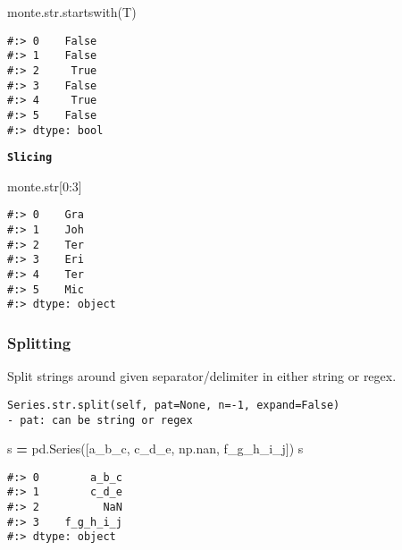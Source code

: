 \documentclass[
]{book}
\newenvironment{Shaded}{\begin{snugshade}}{\end{snugshade}}
\newcommand{\BuiltInTok}[1]{#1}
\newcommand{\DecValTok}[1]{\textcolor[rgb]{0.06,0.06,0.06}{#1}}
\newcommand{\NormalTok}[1]{#1}
\newcommand{\OperatorTok}[1]{\textcolor[rgb]{0.43,0.43,0.43}{\textbf{#1}}}
\newcommand{\StringTok}[1]{\textcolor[rgb]{0.5,0.5,0.5}{#1}}
\begin{document}
\begin{Shaded}
\begin{Highlighting}[]
\NormalTok{monte.}\BuiltInTok{str}\NormalTok{.startswith(}\StringTok{\textquotesingle{}T\textquotesingle{}}\NormalTok{)}
\end{Highlighting}
\end{Shaded}

\begin{verbatim}
#:> 0    False
#:> 1    False
#:> 2     True
#:> 3    False
#:> 4     True
#:> 5    False
#:> dtype: bool
\end{verbatim}

\textbf{\texttt{Slicing}}

\begin{Shaded}
\begin{Highlighting}[]
\NormalTok{monte.}\BuiltInTok{str}\NormalTok{[}\DecValTok{0}\NormalTok{:}\DecValTok{3}\NormalTok{]}
\end{Highlighting}
\end{Shaded}

\begin{verbatim}
#:> 0    Gra
#:> 1    Joh
#:> 2    Ter
#:> 3    Eri
#:> 4    Ter
#:> 5    Mic
#:> dtype: object
\end{verbatim}

\hypertarget{splitting}{%
\subsubsection{Splitting}\label{splitting}}

Split strings around given separator/delimiter in either string or regex.

\begin{verbatim}
Series.str.split(self, pat=None, n=-1, expand=False)
- pat: can be string or regex
\end{verbatim}

\begin{Shaded}
\begin{Highlighting}[]
\NormalTok{s }\OperatorTok{=}\NormalTok{ pd.Series([}\StringTok{\textquotesingle{}a\_b\_c\textquotesingle{}}\NormalTok{, }\StringTok{\textquotesingle{}c\_d\_e\textquotesingle{}}\NormalTok{, np.nan, }\StringTok{\textquotesingle{}f\_g\_h\_i\_j\textquotesingle{}}\NormalTok{])}
\NormalTok{s}
\end{Highlighting}
\end{Shaded}

\begin{verbatim}
#:> 0        a_b_c
#:> 1        c_d_e
#:> 2          NaN
#:> 3    f_g_h_i_j
#:> dtype: object
\end{verbatim}
\end{document}
